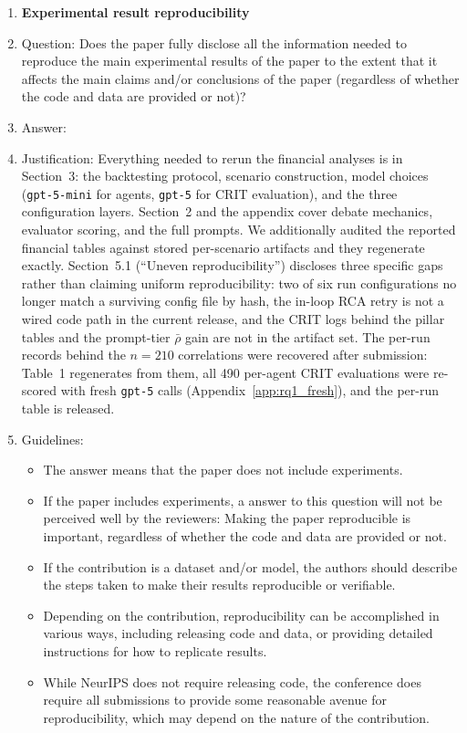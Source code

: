 \begin{enumerate}
\item {\bf Experimental result reproducibility}
    \item[] Question: Does the paper fully disclose all the information needed to reproduce the main experimental results of the paper to the extent that it affects the main claims and/or conclusions of the paper (regardless of whether the code and data are provided or not)?
    \item[] Answer: \answerYes{}
    \item[] Justification: Everything needed to rerun the financial analyses is in Section~3: the backtesting protocol, scenario construction, model choices (\texttt{gpt-5-mini} for agents, \texttt{gpt-5} for CRIT evaluation), and the three configuration layers. Section~2 and the appendix cover debate mechanics, evaluator scoring, and the full prompts. We additionally audited the reported financial tables against stored per-scenario artifacts and they regenerate exactly. Section~5.1 (``Uneven reproducibility'') discloses three specific gaps rather than claiming uniform reproducibility: two of six run configurations no longer match a surviving config file by hash, the in-loop RCA retry is not a wired code path in the current release, and the CRIT logs behind the pillar tables and the prompt-tier $\bar{\rho}$ gain are not in the artifact set. The per-run records behind the $n{=}210$ correlations were recovered after submission: Table~1 regenerates from them, all 490 per-agent CRIT evaluations were re-scored with fresh \texttt{gpt-5} calls (Appendix~\ref{app:rq1_fresh}), and the per-run table is released.
    \item[] Guidelines:
    \begin{itemize}
        \item The answer \answerNA{} means that the paper does not include experiments.
        \item If the paper includes experiments, a \answerNo{} answer to this question will not be perceived well by the reviewers: Making the paper reproducible is important, regardless of whether the code and data are provided or not.
        \item If the contribution is a dataset and/or model, the authors should describe the steps taken to make their results reproducible or verifiable.
        \item Depending on the contribution, reproducibility can be accomplished in various ways, including releasing code and data, or providing detailed instructions for how to replicate results.
        \item While NeurIPS does not require releasing code, the conference does require all submissions to provide some reasonable avenue for reproducibility, which may depend on the nature of the contribution.
    \end{itemize}


\end{enumerate}
